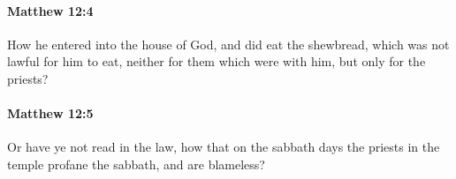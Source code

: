 		\paragraph{Matthew 12:4} %
			\label{MATTHEW-12-4}

			How he entered into the house of God, and did eat the shewbread, which was not lawful for him to eat, neither for them which were with him, but only for the priests?

			\begin{framed}
			\scriptsize
				\begin{compactdesc}
					\item[SBLG] 
				\end{compactdesc}
			\end{framed}

		\paragraph{Matthew 12:5} %
			\label{MATTHEW-12-5}

			Or have ye not read in the law, how that on the sabbath days the priests in the temple profane the sabbath, and are blameless?

